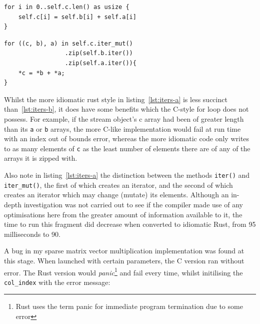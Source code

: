 \noindent\begin{minipage}{.49\textwidth}
    \begin{code}
\begin{verbatim}
for i in 0..self.c.len() as usize {
    self.c[i] = self.b[i] + self.a[i]
}
\end{verbatim}
    \label{lst:iters-b}
\end{code}
\end{minipage}\hfill
\begin{minipage}{.49\textwidth}
    \begin{code}
\begin{verbatim}
for ((c, b), a) in self.c.iter_mut()
                 .zip(self.b.iter())
                 .zip(self.a.iter()){
    *c = *b + *a;
}
\end{verbatim}
\label{lst:iters-a}
\end{code}
\end{minipage}

Whilst the more idiomatic rust style in listing~\ref{lst:iters-a} is less succinct than~\ref{lst:iters-b}, it does have some benefits which the C-style for loop does not possess. For example, if the stream object's c array had been of greater length than its \texttt{a} or \texttt{b} arrays, the more C-like implementation would fail at run time with an index out of bounds error, whereas the more idiomatic code only writes to as many elements of \texttt{c} as the least number of elements there are of any of the arrays it is zipped with.

Also note in listing~\ref{lst:iters-a} the distinction between the methods \texttt{iter()} and \texttt{iter\_mut()}, the first of which creates an iterator, and the second of which creates an iterator which may change (mutate) its elements. Although an in-depth investigation was not carried out to see if the compiler made use of any optimisations here from the greater amount of information available to it, the time to run this fragment did decrease when converted to idiomatic Rust, from 95 milliseconds to 90.

A bug in my sparse matrix vector multiplication implementation was found at this stage. When launched with certain parameters, the C version ran without error. The Rust version would {\em panic}\footnote{Rust uses the term panic for immediate program termination due to some error} and fail every time, whilst initilising the \texttt{col\_index} with the error message:


